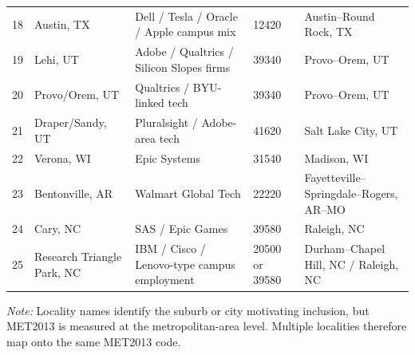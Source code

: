 \documentclass[12pt]{article}
\begin{document}
\begin{table}[!htbp]
\begin{tabularx}{\textwidth}{@{}r C{0.15\textwidth} Y C{0.10\textwidth} Y@{}}
18 & Austin, TX & Dell / Tesla / Oracle / Apple campus mix & 12420 & Austin--Round Rock, TX \\
19 & Lehi, UT & Adobe / Qualtrics / Silicon Slopes firms & 39340 & Provo--Orem, UT \\
20 & Provo/Orem, UT & Qualtrics / BYU-linked tech & 39340 & Provo--Orem, UT \\
21 & Draper/Sandy, UT & Pluralsight / Adobe-area tech & 41620 & Salt Lake City, UT \\
22 & Verona, WI & Epic Systems & 31540 & Madison, WI \\
23 & Bentonville, AR & Walmart Global Tech & 22220 & Fayetteville--Springdale--Rogers, AR--MO \\
24 & Cary, NC & SAS / Epic Games & 39580 & Raleigh, NC \\
25 & Research Triangle Park, NC & IBM / Cisco / Lenovo-type campus employment & 20500 or 39580 & Durham--Chapel Hill, NC / Raleigh, NC \\
\bottomrule
\end{tabularx}

\vspace{0.25em}
\begin{minipage}{0.96\textwidth}
\tiny
\textit{Note:} Locality names identify the suburb or city motivating inclusion, but MET2013 is measured at the metropolitan-area level. Multiple localities therefore map onto the same MET2013 code.
\end{minipage}
\end{table}

\newpage
\printbibliography
\end{document}
